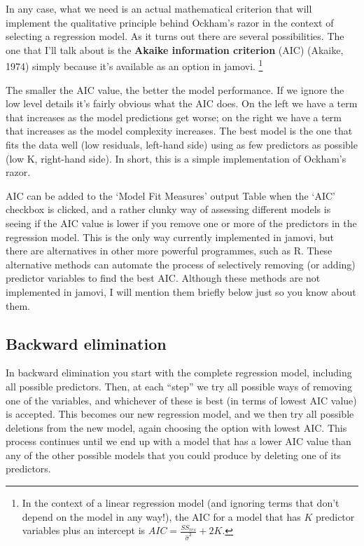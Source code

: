 \documentclass[
  a4paper,
]{book}
\begin{document}
In any case, what we need is an actual mathematical criterion that will
implement the qualitative principle behind Ockham's razor in the context
of selecting a regression model. As it turns out there are several
possibilities. The one that I'll talk about is the \textbf{Akaike
information criterion} (AIC) (Akaike, 1974) simply because it's
available as an option in jamovi. \footnote{In the context of a linear
  regression model (and ignoring terms that don't depend on the model in
  any way!), the AIC for a model that has \(K\) predictor variables plus
  an intercept is \(AIC=\frac{SS_{res}}{\hat{\sigma}^2}+2K\).}

The smaller the AIC value, the better the model performance. If we
ignore the low level details it's fairly obvious what the AIC does. On
the left we have a term that increases as the model predictions get
worse; on the right we have a term that increases as the model
complexity increases. The best model is the one that fits the data well
(low residuals, left-hand side) using as few predictors as possible (low
K, right-hand side). In short, this is a simple implementation of
Ockham's razor.

AIC can be added to the `Model Fit Measures' output Table when the `AIC'
checkbox is clicked, and a rather clunky way of assessing different
models is seeing if the AIC value is lower if you remove one or more of
the predictors in the regression model. This is the only way currently
implemented in jamovi, but there are alternatives in other more powerful
programmes, such as R. These alternative methods can automate the
process of selectively removing (or adding) predictor variables to find
the best AIC. Although these methods are not implemented in jamovi, I
will mention them briefly below just so you know about them.

\hypertarget{backward-elimination}{%
\subsection{Backward elimination}\label{backward-elimination}}

In backward elimination you start with the complete regression model,
including all possible predictors. Then, at each ``step'' we try all
possible ways of removing one of the variables, and whichever of these
is best (in terms of lowest AIC value) is accepted. This becomes our new
regression model, and we then try all possible deletions from the new
model, again choosing the option with lowest AIC. This process continues
until we end up with a model that has a lower AIC value than any of the
other possible models that you could produce by deleting one of its
predictors.
\end{document}
